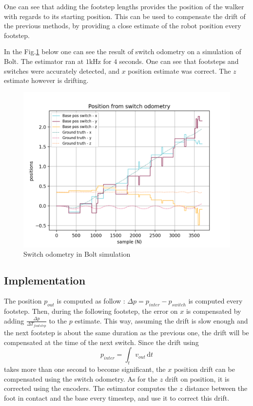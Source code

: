 \documentclass[a4paper,10pt]{article}
\begin{document}
One can see that adding the footstep lengths provides the position of the walker with regards to its starting position. This can be used to compensate the drift of the previous methods, by providing a close estimate of the robot position every footstep.


In the Fig.\ref{fig:switch_odometry_simu} below one can see the result of switch odometry on a simulation of Bolt. The estimator ran at $1$kHz for $4$ seconds. One can see that footsteps and switches were accurately detected, and $x$ position estimate was correct. The $z$ estimate however is drifting. 


\begin{figure}[H]
\label{fig:switch_odometry_simu}
\centering
  \includegraphics[width=\linewidth, angle=0, scale=0.7]{./images/switch_odometry2.png}
  \caption{Switch odometry in Bolt simulation }
\end{figure}

\subsection{Implementation}

The position $p_{out}$ is computed as follow : $\Delta p = p_{inter} - p_{switch}$ is computed every footstep. Then, during the following footstep, the error on $x$ is compensated by adding $\frac{\Delta p}{\Delta T_{footstep}}$ to the $p$ estimate. This way, assuming the drift is slow enough and the next footstep is about the same duration as the previous one, the drift will be compensated at the time of the next switch. Since the drift using 
$$ p_{inter} = \int_t v_{out} \, \mathrm{d}t $$
takes more than one second to become significant, the $x$ position drift can be compensated using the switch odometry.
As for the $z$ drift on position, it is corrected using the encoders. The estimator computes the $z$ distance between the foot in contact and the base every timestep, and use it to correct this drift.
\end{document}
